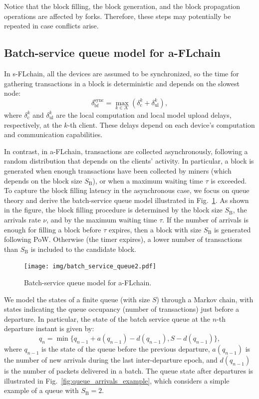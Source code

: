 \documentclass[lettersize,journal]{IEEEtran}
\begin{document}
Notice that the block filling, the block generation, and the block propagation operations are affected by forks. Therefore, these steps may potentially be repeated in case conflicts arise.

\subsection{Batch-service queue model for a-FLchain}

In s-FLchain, all the devices are assumed to be synchronized, so the time for gathering transactions in a block is deterministic and depends on the slowest node:
\begin{equation}
\delta_\text{bf}^\text{sync} = \max_{k\in \mathcal{K}} (\delta_\text{c}^k + \delta_\text{ul}^k),
\end{equation}
where $\delta_\text{c}^k$ and $\delta_\text{ul}^k$ are the local computation and local model upload delays, respectively, at the $k$-th client. These delays depend on each device's computation and communication capabilities. 

In contrast, in a-FLchain, transactions are collected asynchronously, following a random distribution that depends on the clients' activity. In particular, a block is generated when enough transactions have been collected by miners (which depends on the block size $S_\text{B}$), or when a maximum waiting time $\tau$ is exceeded. To capture the block filling latency in the asynchronous case, we focus on queue theory and derive the batch-service queue model illustrated in Fig.~\ref{fig:batch_service_queue}. As shown in the figure, the block filling procedure is determined by the block size $S_\text{B}$, the arrivals rate $\nu$, and by the maximum waiting time $\tau$. If the number of arrivals is enough for filling a block before $\tau$ expires, then a block with size $S_\text{B}$ is generated following PoW. Otherwise (the timer expires), a lower number of transactions than $S_\text{B}$ is included to the candidate block. 

\begin{figure}[ht!]
	\centering
	\texttt{[image: img/batch\_service\_queue2.pdf]}
	\caption{Batch-service queue model for a-FLchain.}
	\label{fig:batch_service_queue}
\end{figure}

We model the states of a finite queue (with size $S$) through a Markov chain, with states indicating the queue occupancy (number of transactions) just before a departure. In particular, the state of the batch service queue at the $n$-th departure instant is given by:
\begin{equation}
q_n = 
\min \Big\{ q_{n-1} + a(q_{n-1}) - d(q_{n-1}), S - d(q_{n-1}) \Big\},
\end{equation}
where $q_{n-1}$ is the state of the queue before the previous departure, $a(q_{n-1})$ is the number of new arrivals during the last inter-departure epoch, and $d(q_{n-1})$ is the number of packets delivered in a batch. The queue state after departures is illustrated in Fig.~\ref{fig:queue_arrivals_example}, which considers a simple example of a queue with $S_\text{B}=2$. 
\end{document}
